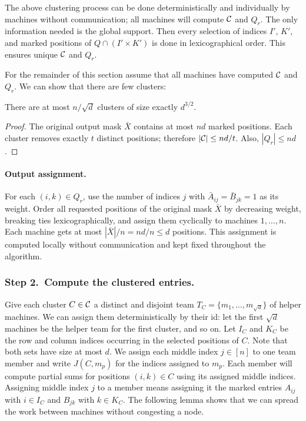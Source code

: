 \begin{observation}
	The above clustering process can be done deterministically and individually by machines without communication; all machines will compute $\mathcal{C}$ and $Q_r$. The only information needed is the global support. Then every selection of indices $I'$, $K'$, and marked positions of $Q\cap(I'\times K')$ is done in lexicographical order. This ensures unique $\mathcal{C}$ and $Q_r$.
\end{observation}
	For the remainder of this section assume that all machines have computed $\mathcal{C}$ and $Q_r$. We can show that there are few clusters:
\begin{lemma}
	There are at most $n/\sqrt d$ clusters of size exactly $d^{3/2}$.
\end{lemma}
\begin{proof}
	The original output mask $\bar{X}$ contains at most $nd$ marked positions.
	Each cluster removes exactly $t$ distinct positions; therefore
	$|\mathcal{C}|\le nd/t$. Also, $|Q_r|\le nd$.

\end{proof}

\paragraph{Output assignment.}
For each $(i,k)\in Q_r$, use the number of indices $j$ with
$\bar A_{ij}=\bar B_{jk}=1$ as its weight. Order all requested positions of the original mask $\bar X$ by decreasing weight, breaking ties lexicographically, and assign them cyclically to machines $1,\ldots,n$.
Each machine gets at most $|\bar X|/n=nd/n\le d$ positions.
This assignment is computed locally without communication and
kept fixed throughout the algorithm.

\subsubsection{Step 2.~Compute the clustered entries.}
Give each cluster $C\in\mathcal{C}$ a distinct and disjoint team
$T_C=\{m_1,\ldots,m_{\sqrt d}\}$ of helper machines. We can assign them deterministically by their id: let the first $\sqrt{d}$ machines be the helper team for the first cluster, and so on.
Let $I_C$ and $K_C$ be the row and column indices occurring in
the selected positions of $C$. Note that both sets have size at most $d$.
We assign each middle index $j\in[n]$ to one team member and
write $J(C,m_p)$ for the indices assigned to $m_p$.
Each member will compute partial sums for positions $(i,k)\in C$
using its assigned middle indices. Assigning middle index $j$ to a member means assigning it the marked entries $A_{ij}$ with $i\in I_C$ and
$B_{jk}$ with $k\in K_C$. The following lemma shows that we can spread the work between machines without congesting a node. 


